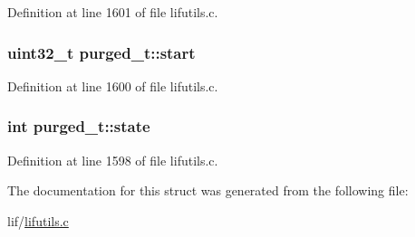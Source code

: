 Definition at line 1601 of file lifutils.\+c.

\subsubsection[{\texorpdfstring{start}{start}}]{\setlength{\rightskip}{0pt plus 5cm}uint32\+\_\+t purged\+\_\+t\+::start}\hypertarget{structpurged__t_afeb1148800092fe0b7e73a9dc6839a37}{}\label{structpurged__t_afeb1148800092fe0b7e73a9dc6839a37}


Definition at line 1600 of file lifutils.\+c.

\subsubsection[{\texorpdfstring{state}{state}}]{\setlength{\rightskip}{0pt plus 5cm}int purged\+\_\+t\+::state}\hypertarget{structpurged__t_a2c08c2063d9649c18d5316a50cf5bec6}{}\label{structpurged__t_a2c08c2063d9649c18d5316a50cf5bec6}


Definition at line 1598 of file lifutils.\+c.



The documentation for this struct was generated from the following file\+:\begin{DoxyCompactItemize}
\item 
lif/\hyperlink{lifutils_8c}{lifutils.\+c}\end{DoxyCompactItemize}

